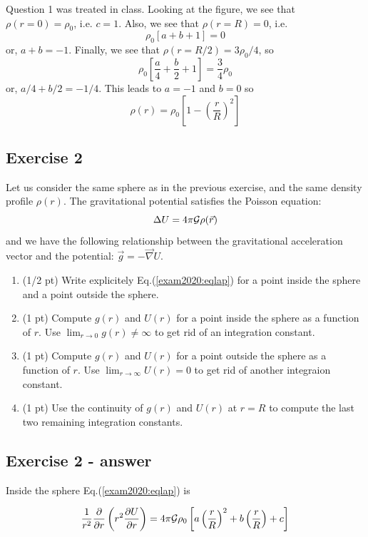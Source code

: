 Question 1 was treated in class.  
Looking at the figure, we see that $\rho(r=0)=\rho_0$, i.e. $c=1$.
Also, we see that $\rho(r=R)=0$, i.e.
\[
\rho_0 \left[ a +b + 1 \right] =0 
\]
or, $a+b=-1$.
Finally, we see that $\rho(r=R/2)=3\rho_0/4$, so
\[
\rho_0 \left[ \frac{a}{4} +\frac{b}{2} +1 \right] = \frac{3}{4}\rho_0
\]
or, $a/4 + b/2 = -1/4$.
This leads to $a=-1$ and $b=0$ so 
\[
\rho(r) = \rho_0 \left[ 1 - \left(\frac{r}{R}\right)^2  \right]
\]


\subsection*{Exercise 2}

Let us consider the same sphere as in the previous exercise, and the same density profile $\rho(r)$.
The gravitational potential satisfies the Poisson equation:
\begin{equation}
\Delta U = 4 \pi {\cal G} \rho({\vec r}) \label{exam2020:eqlap}
\end{equation}
and we have the following relationship between the gravitational acceleration 
vector and the potential: ${\vec g}=-{\vec \nabla} U$.

\begin{enumerate}
\item (1/2 pt) Write explicitely Eq.(\ref{exam2020:eqlap}) for a point inside the sphere and a point outside the sphere.
\item (1 pt) Compute $g(r)$ and $U(r)$ for a point inside the sphere as a function of $r$. Use 
$\lim_{r\rightarrow 0} g(r) \neq \infty$
to get rid of an integration constant.
\item (1 pt) Compute $g(r)$ and $U(r)$ for a point outside the sphere as a function of $r$. 
Use $\lim_{r\rightarrow\infty}U(r)=0$ to get rid of another integraion constant.
\item (1 pt) Use the continuity of $g(r)$ and $U(r)$ at $r=R$ 
to compute the last two remaining integration constants.
\end{enumerate}

\subsection*{Exercise 2 - answer}

Inside the sphere Eq.(\ref{exam2020:eqlap}) is

\begin{equation}
\frac{1}{r^2} \frac{\partial}{\partial r} \left( r^2 \frac{\partial U}{\partial r} \right) = 4 \pi {\cal G} 
\rho_0 \left[ a \left(\frac{r}{R}\right)^2+ b \left(\frac{r}{R}\right) + c \right]
\end{equation}

